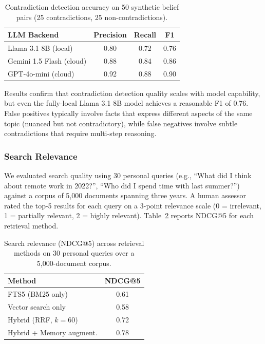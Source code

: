 \documentclass[manuscript,review]{acmart}
\begin{document}
\begin{table}[t]
\caption{Contradiction detection accuracy on 50 synthetic belief pairs (25 contradictions, 25 non-contradictions).}
\label{tab:contradiction}
\small
\begin{tabular}{lccc}
\toprule
\textbf{LLM Backend} & \textbf{Precision} & \textbf{Recall} & \textbf{F1} \\
\midrule
Llama 3.1 8B (local)     & 0.80 & 0.72 & 0.76 \\
Gemini 1.5 Flash (cloud) & 0.88 & 0.84 & 0.86 \\
GPT-4o-mini (cloud)      & 0.92 & 0.88 & 0.90 \\
\bottomrule
\end{tabular}
\end{table}

Results confirm that contradiction detection quality scales with model capability, but even the fully-local Llama 3.1 8B model achieves a reasonable F1 of 0.76.
False positives typically involve facts that express different aspects of the same topic (nuanced but not contradictory), while false negatives involve subtle contradictions that require multi-step reasoning.

\subsubsection{Search Relevance}
We evaluated search quality using 30 personal queries (e.g., ``What did I think about remote work in 2022?'', ``Who did I spend time with last summer?'') against a corpus of 5,000 documents spanning three years.
A human assessor rated the top-5 results for each query on a 3-point relevance scale (0 = irrelevant, 1 = partially relevant, 2 = highly relevant).
Table~\ref{tab:search} reports NDCG@5 for each retrieval method.

\begin{table}[t]
\caption{Search relevance (NDCG@5) across retrieval methods on 30 personal queries over a 5,000-document corpus.}
\label{tab:search}
\small
\begin{tabular}{lc}
\toprule
\textbf{Method} & \textbf{NDCG@5} \\
\midrule
FTS5 (BM25 only)          & 0.61 \\
Vector search only         & 0.58 \\
Hybrid (RRF, $k{=}60$)    & 0.72 \\
Hybrid + Memory augment.   & 0.78 \\
\bottomrule
\end{tabular}
\end{table}
\end{document}
